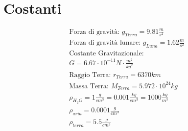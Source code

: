 \section{Costanti}

\begin{gather*}
\text{Forza di gravità: } g_{Terra} = 9.81 \frac{m}{s^2} \\
\text{Forza di gravità lunare: } g_{Luna} = 1.62 \frac{m}{s^2} \\
\text{Costante Gravitazionale: } \\
G = 6.67 \cdot 10^{-11} N \cdot \frac{m^2}{kg^2} \\
\text{Raggio Terra: } r_{Terra} = 6370 km \\
\text{Massa Terra: } M_{Terra} = 5.972 \cdot 10^{24} kg \\
\rho_{H_2O} = 1 \frac{g}{cm^3} = 0.001 \frac{kg}{cm^3} = 1000 \frac{kg}{m^3} \\
\rho_{aria} = 0.0001 \frac{g}{cm^3} \\
\rho_{terra} = 5.5 \frac{g}{cm^3}
\end{gather*}